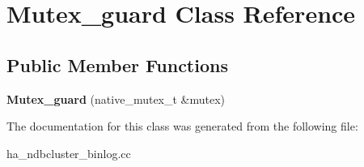 \hypertarget{classMutex__guard}{}\section{Mutex\+\_\+guard Class Reference}
\label{classMutex__guard}
\subsection*{Public Member Functions}
\begin{DoxyCompactItemize}
\item 
\mbox{\label{classMutex__guard_a2a96482d243d56d355ade3763d3ad04c}} 
{\bfseries Mutex\+\_\+guard} (native\+\_\+mutex\+\_\+t \&mutex)
\end{DoxyCompactItemize}


The documentation for this class was generated from the following file\+:\begin{DoxyCompactItemize}
\item 
ha\+\_\+ndbcluster\+\_\+binlog.\+cc\end{DoxyCompactItemize}
